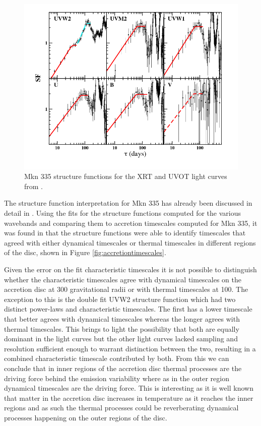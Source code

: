 \documentclass[12pt, oneside]{smuthesis}
\begin{document}
\begin{figure}[H]
	\centering
	\includegraphics[width=\linewidth]{Mkn335sf}
	\caption{Mkn 335 structure functions for the XRT and UVOT light curves from \cite{galloblue}.}
	\label{fig:mkn335sf}
\end{figure}

The structure function interpretation for Mkn 335 has already been discussed in detail in \cite{galloblue}. Using the fits for the structure functions computed for the various wavebands and comparing them to accretion timescales computed for Mkn 335, it was found in \cite{galloblue} that the structure functions were able to identify timescales that agreed with either dynamical timescales or thermal timescales in different regions of the disc, shown in Figure \ref{fig:accretiontimescales}.

Given the error on the fit characteristic timescales it is not possible to distinguish whether the characteristic timescales agree with dynamical timescales on the accretion disc at 300 gravitational radii or with thermal timescales at 100. The exception to this is the double fit UVW2 structure function which had two distinct power-laws and characteristic timescales. The first has a lower timescale that better agrees with dynamical timescales whereas the longer agrees with thermal timescales. This brings to light the possibility that both are equally dominant in the light curves but the other light curves lacked sampling and resolution sufficient enough to warrant distinction between the two, resulting in a combined characteristic timescale contributed by both. From this we can conclude that in inner regions of the accretion disc thermal processes are the driving force behind the emission variability where as in the outer region dynamical timescales are the driving force. This is interesting as it is well known that matter in the accretion disc increases in temperature as it reaches the inner regions and as such the thermal processes could be reverberating dynamical processes happening on the outer regions of the disc.
\end{document}
